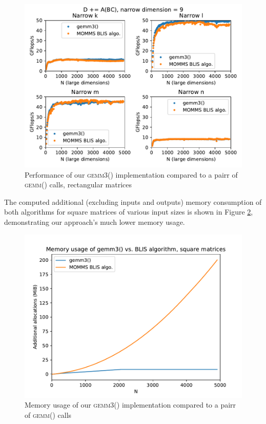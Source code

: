 \documentclass[12pt]{article}
\newcommand*{\gemmt}{{\textsc{gemm3()}}}
\newcommand*{\gemm}{{\textsc{gemm()}}}
\begin{document}
\begin{figure}
  \centering
  \includegraphics[height=0.45\textheight]{../results/earwig2/gemm3_rectangles}
  \caption{Performance of our \gemmt{} implementation compared to a pairr of \gemm{} calls, rectangular matrices}
  \label{fig:bc_rectangles}
\end{figure}

The computed additional (excluding inputs and outputs) memory consumption of both algorithms for square matrices of various input sizes is shown in Figure \ref{fig:bc_square_mem}, demonstrating our approach's much lower memory usage.
\begin{figure}
  \centering
  \includegraphics[height=0.4\textheight]{../results/earwig2/gemm3_memory}
  \caption{Memory usage of our \gemmt{} implementation compared to a pairr of \gemm{} calls}
  \label{fig:bc_square_mem}
\end{figure}
\end{document}
